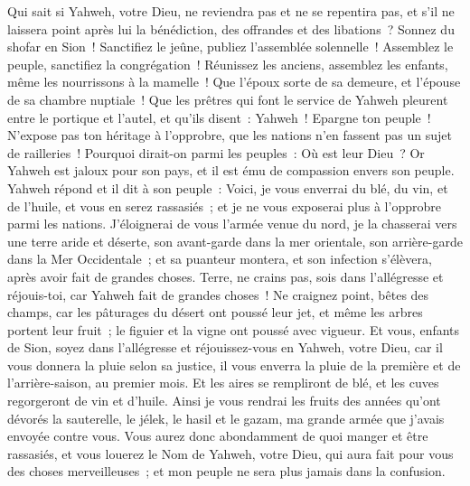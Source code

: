 \begin{multicols}{2}
Qui sait si Yahweh, votre Dieu, ne reviendra pas et ne se repentira pas, et s'il ne laissera point après lui la bénédiction, des offrandes et des libations~?
Sonnez du shofar en Sion~! Sanctifiez le jeûne, publiez l'assemblée solennelle~!
Assemblez le peuple, sanctifiez la congrégation~! Réunissez les anciens, assemblez les enfants, même les nourrissons à la mamelle~! Que l'époux sorte de sa demeure, et l'épouse de sa chambre nuptiale~!
Que les prêtres qui font le service de Yahweh pleurent entre le portique et l'autel, et qu'ils disent~: Yahweh~! Epargne ton peuple~! N'expose pas ton héritage à l'opprobre, que les nations n'en fassent pas un sujet de railleries~! Pourquoi dirait-on parmi les peuples~: Où est leur Dieu~?
Or Yahweh est jaloux pour son pays, et il est ému de compassion envers son peuple.
Yahweh répond et il dit à son peuple~: Voici, je vous enverrai du blé, du vin, et de l'huile, et vous en serez rassasiés~; et je ne vous exposerai plus à l'opprobre parmi les nations.
J'éloignerai de vous l'armée venue du nord, je la chasserai vers une terre aride et déserte, son avant-garde dans la mer orientale, son arrière-garde dans la Mer Occidentale~; et sa puanteur montera, et son infection s'élèvera, après avoir fait de grandes choses.
Terre, ne crains pas, sois dans l'allégresse et réjouis-toi, car Yahweh fait de grandes choses~!
Ne craignez point, bêtes des champs, car les pâturages du désert ont poussé leur jet, et même les arbres portent leur fruit~; le figuier et la vigne ont poussé avec vigueur.
Et vous, enfants de Sion, soyez dans l'allégresse et réjouissez-vous en Yahweh, votre Dieu, car il vous donnera la pluie selon sa justice, il vous enverra la pluie de la première et de l'arrière-saison, au premier mois.
Et les aires se rempliront de blé, et les cuves regorgeront de vin et d'huile.
Ainsi je vous rendrai les fruits des années qu'ont dévorés la sauterelle, le jélek, le hasil et le gazam, ma grande armée que j'avais envoyée contre vous.
Vous aurez donc abondamment de quoi manger et être rassasiés, et vous louerez le Nom de Yahweh, votre Dieu, qui aura fait pour vous des choses merveilleuses~; et mon peuple ne sera plus jamais dans la confusion.

\end{multicols}
